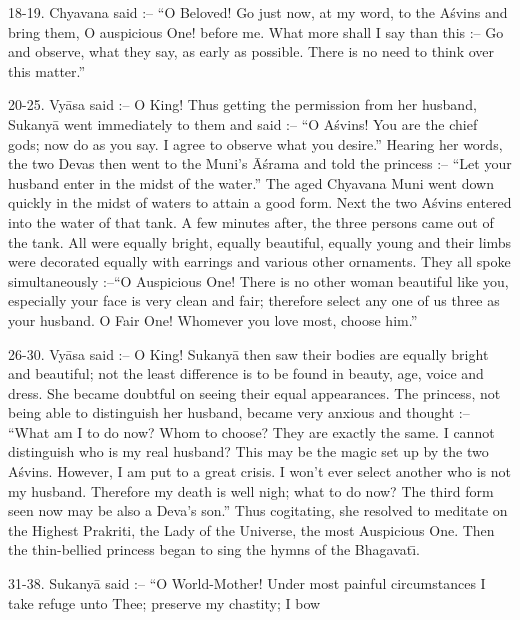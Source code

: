 18-19. Chyavana said :-- ``O Beloved! Go just now, at my word, to the A\'svins and bring them, O auspicious One! before me. What more shall I say than this :-- Go and observe, what they say, as early as possible. There is no need to think over this matter.''

20-25. Vy\=asa said :-- O King! Thus getting the permission from her husband, Sukany\=a went immediately to them and said :-- ``O A\'svins! You are the chief gods; now do as you say. I agree to observe what you desire.'' Hearing her words, the two Devas then went to the Muni's \=A\'srama and told the princess :-- ``Let your husband enter in the midst of the water.'' The aged Chyavana Muni went down quickly in the midst of waters to attain a good form. Next the two A\'svins entered into the water of that tank. A few minutes after, the three persons came out of the tank. All were equally bright, equally beautiful, equally young and their limbs were decorated equally with earrings and various other ornaments. They all spoke simultaneously :--``O Auspicious One! There is no other woman beautiful like you, especially your face is very clean and fair; therefore select any one of us three as your husband. O Fair One! Whomever you love most, choose him.''

26-30. Vy\=asa said :-- O King! Sukany\=a then saw their bodies are equally bright and beautiful; not the least difference is to be found in beauty, age, voice and dress. She became doubtful on seeing their equal appearances. The princess, not being able to distinguish her husband, became very anxious and thought :-- ``What am I to do now? Whom to choose? They are exactly the same. I cannot distinguish who is my real husband? This may be the magic set up by the two A\'svins. However, I am put to a great crisis. I won't ever select another who is not my husband. Therefore my death is well nigh; what to do now? The third form seen now may be also a Deva's son.'' Thus cogitating, she resolved to meditate on the Highest Prakriti, the Lady of the Universe, the most Auspicious One. Then the thin-bellied princess began to sing the hymns of the Bhagavat\={\i}.

31-38. Sukany\=a said :-- ``O World-Mother! Under most painful circumstances I take refuge unto Thee; preserve my chastity; I bow

